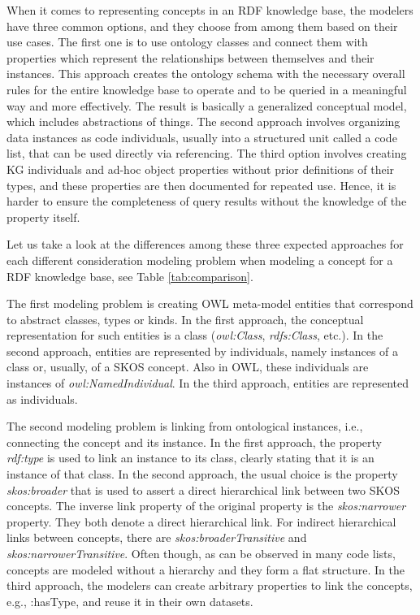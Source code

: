 When it comes to representing concepts in an RDF knowledge base, the modelers have three common options, and they choose from among them based on their use cases. The first one is to use ontology classes and connect them with properties which represent the relationships between themselves and their instances. This approach creates the ontology schema with the necessary overall rules for the entire knowledge base to operate and to be queried in a meaningful way and more effectively. The result is basically a generalized conceptual model, which includes abstractions of things. The second approach involves organizing data instances as code individuals, usually into a structured unit called a code list, that can be used directly via referencing. The third option involves creating KG individuals and ad-hoc object properties without prior definitions of their types, and these properties are then documented for repeated use. Hence, it is harder to ensure the completeness of query results without the knowledge of the property itself.

Let us take a look at the differences among these three expected approaches for each different consideration modeling problem when modeling a concept for a RDF knowledge base, see Table \ref{tab:comparison}. 

The first modeling problem is creating OWL meta-model entities that correspond to abstract classes, types or kinds. In the first approach, the conceptual representation for such entities is a class (\textit{owl:Class}, \textit{rdfs:Class}, etc.). In the second approach, entities are represented by individuals, namely instances of a class or, usually, of a SKOS concept. Also in OWL, these individuals are instances of \textit{owl:NamedIndividual}. In the third approach, entities are represented as individuals.

The second modeling problem is linking from ontological instances, i.e., connecting the concept and its instance. In the first approach, the property \textit{rdf:type} is used to link an instance to its class, clearly stating that it is an instance of that class. In the second approach, the usual choice is the property \textit{skos:broader} that is used to assert a direct hierarchical link between two SKOS concepts. The inverse link property of the original property is the \textit{skos:narrower} property. They both denote a direct hierarchical link. For indirect hierarchical links between concepts, there are \textit{skos:broaderTransitive} and \textit{skos:narrowerTransitive}. Often though, as can be observed in many code lists, concepts are modeled without a hierarchy and they form a flat structure. In the third approach, the modelers can create arbitrary properties to link the concepts, e.g., :hasType, and reuse it in their own datasets.

